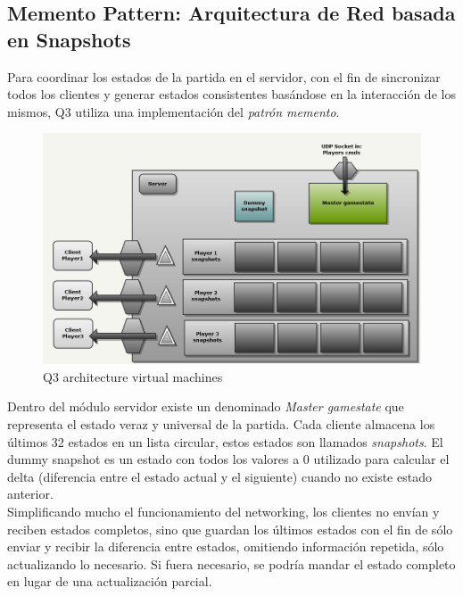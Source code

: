 \documentclass[a4paper,12pt]{report}
\begin{document}
    \subsection{Memento Pattern: Arquitectura de Red basada en Snapshots}
	Para coordinar los estados de la partida en el servidor, con el fin de sincronizar todos los clientes y generar estados consistentes basándose en la interacción de los mismos, Q3 utiliza una implementación del \textit{patrón memento}.\\
	\newpage
	\begin{center}
		\begin{figure}[h]
			\includegraphics[width=1\textwidth]{images/q3_network_arch}
			\caption{Q3 architecture virtual machines}
			\label{figq3network}
		\end{figure}
	\end{center}

	Dentro del módulo servidor existe un denominado \textit{Master gamestate} que representa el estado veraz y universal de la partida. Cada cliente almacena los últimos 32 estados en un lista circular, estos estados son llamados \textit{snapshots}. El dummy snapshot es un estado con todos los valores a 0 utilizado para calcular el delta (diferencia entre el estado actual y el siguiente) cuando no existe estado anterior.\\
	
	Simplificando mucho el funcionamiento del networking, los clientes no envían y reciben estados completos, sino que guardan los últimos estados con el fin de sólo enviar y recibir la diferencia entre estados, omitiendo información repetida, sólo actualizando lo necesario. Si fuera necesario, se podría mandar el estado completo en lugar de una actualización parcial.\\
	
\end{document}
